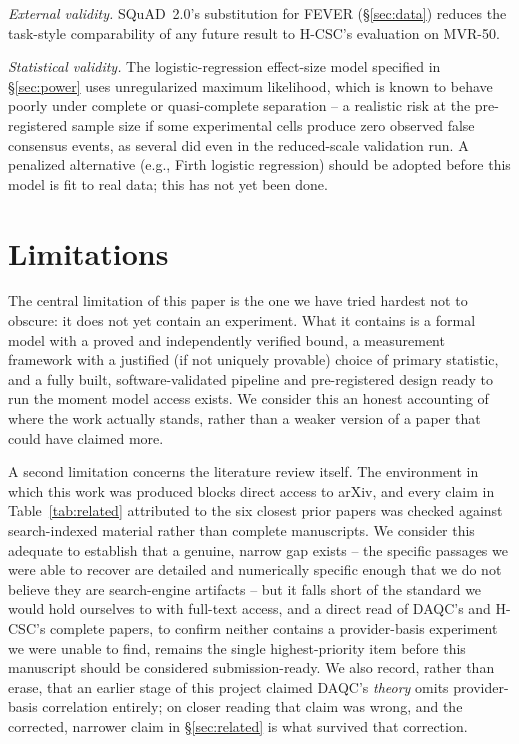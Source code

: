 \documentclass[journal]{IEEEtran}
\begin{document}
\emph{External validity.} SQuAD~2.0's substitution for FEVER (\S\ref{sec:data}) reduces the task-style comparability of any future result to H-CSC's evaluation on MVR-50.

\emph{Statistical validity.} The logistic-regression effect-size model specified in \S\ref{sec:power} uses unregularized maximum likelihood, which is known to behave poorly under complete or quasi-complete separation -- a realistic risk at the pre-registered sample size if some experimental cells produce zero observed false consensus events, as several did even in the reduced-scale validation run. A penalized alternative (e.g., Firth logistic regression) should be adopted before this model is fit to real data; this has not yet been done.

\section{Limitations}
\label{sec:limitations}

The central limitation of this paper is the one we have tried hardest not to obscure: it does not yet contain an experiment. What it contains is a formal model with a proved and independently verified bound, a measurement framework with a justified (if not uniquely provable) choice of primary statistic, and a fully built, software-validated pipeline and pre-registered design ready to run the moment model access exists. We consider this an honest accounting of where the work actually stands, rather than a weaker version of a paper that could have claimed more.

A second limitation concerns the literature review itself. The environment in which this work was produced blocks direct access to arXiv, and every claim in Table~\ref{tab:related} attributed to the six closest prior papers was checked against search-indexed material rather than complete manuscripts. We consider this adequate to establish that a genuine, narrow gap exists -- the specific passages we were able to recover are detailed and numerically specific enough that we do not believe they are search-engine artifacts -- but it falls short of the standard we would hold ourselves to with full-text access, and a direct read of DAQC's and H-CSC's complete papers, to confirm neither contains a provider-basis experiment we were unable to find, remains the single highest-priority item before this manuscript should be considered submission-ready. We also record, rather than erase, that an earlier stage of this project claimed DAQC's \emph{theory} omits provider-basis correlation entirely; on closer reading that claim was wrong, and the corrected, narrower claim in \S\ref{sec:related} is what survived that correction.
\end{document}
